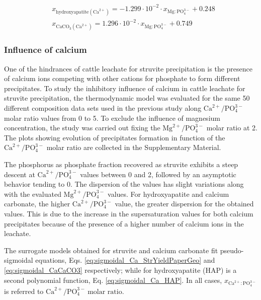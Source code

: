 \begin{refsection}[referencesCh3]
\begin{align}
& x_{\text{hydroxyapatite} \left(\text{Ca}^{2+}\right)} = -1.299 \cdot 10^{-2} \cdot x_{\text{Mg}:\text{PO}_{4}^{3-}} + 0.248 \label{eq:1poly_Mg_CaCO3}\\
& x_{\text{CaCO}_{3} \left(\text{Ca}^{2+}\right)} = 1.296 \cdot 10^{-2} \cdot x_{\text{Mg}:\text{PO}_{4}^{3-}} + 0.749 \label{eq:1poly_Mg_HAP} 
\end{align}

\subsubsection{Influence of calcium}
One of the hindrances of cattle leachate for struvite precipitation is the presence of calcium ions competing with other cations for phosphate to form different precipitates.
To study the inhibitory influence of calcium in cattle leachate for struvite precipitation, the thermodynamic model was evaluated for the same 50 different composition data sets used in the previous study along $\text{Ca}^{2+}/\text{PO}_{4}^{3-}$ molar ratio values from 0 to 5. To exclude the influence of magnesium concentration, the study was carried out fixing the $\text{Mg}^{2+}/\text{PO}_{4}^{3-}$ molar ratio at 2.
The plots showing evolution of precipitates formation in function of the $\text{Ca}^{2+}/\text{PO}_{4}^{3-}$ molar ratio are collected in the Supplementary Material. 

The phosphorus as phosphate fraction recovered as struvite exhibits a steep descent at $\text{Ca}^{2+}/\text{PO}_{4}^{3-}$ values between 0 and 2, followed by an asymptotic behavior tending to 0. The dispersion of the values has slight variations along with the evaluated $\text{Mg}^{2+}/\text{PO}_{4}^{3-}$ values.
For hydroxyapatite and calcium carbonate, the higher $\text{Ca}^{2+}/\text{PO}_{4}^{3-}$ value, the greater dispersion for the obtained values. This is due to the increase in the supersaturation values for both calcium precipitates because of the presence of a higher number of calcium ions in the leachate.

The surrogate models obtained for struvite and calcium carbonate fit pseudo-sigmoidal equations, Eqs. \ref{eq:sigmoidal_Ca_StrYieldPaperGeo} and \ref{eq:sigmoidal_CaCaCO3} respectively; while for hydroxyapatite (HAP) is a second polynomial function, Eq. \ref{eq:sigmoidal_Ca_HAP}. In all cases, $ x_{\text{Ca}^{2+}:\text{PO}_{4}^{3-}}$ is referred to $\text{Ca}^{2+}/\text{PO}_{4}^{3-} \ \text{molar ratio}$.


\end{refsection}
